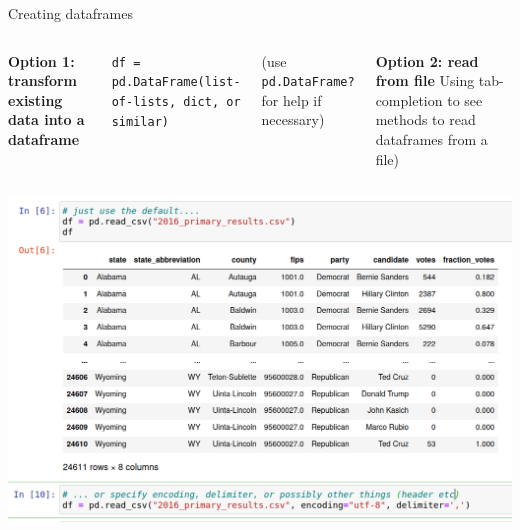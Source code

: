 \documentclass[compress]{beamer}
\begin{document}
\begin{frame}{Creating dataframes}
	\begin{columns}[T]
\textbf{Option 1: transform existing data into a dataframe}
	
\texttt{df = pd.DataFrame(list-of-lists, dict, or similar)}

(use \texttt{pd.DataFrame?} for help if necessary)

\textbf{Option 2: read from file}
Using tab-completion to see methods to read dataframes from a file)
	\end{columns}
\end{frame}

\begin{frame}[plain]
	\includegraphics[width=\columnwidth,height=\paperheight,keepaspectratio]{../../pictures/pd-read-csv.png}
\end{frame}
\end{document}
